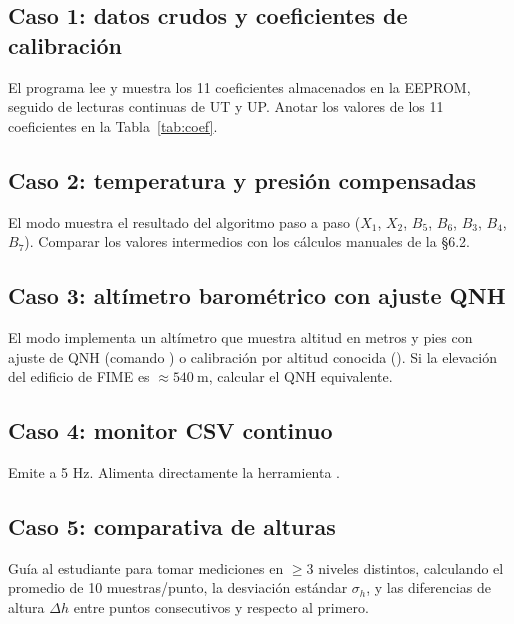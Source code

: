 \documentclass[11pt]{article}
\begin{document}
\subsection{Caso 1: datos crudos y coeficientes de calibración}
El programa lee y muestra los 11 coeficientes almacenados en la EEPROM, seguido de
lecturas continuas de UT y UP. Anotar los valores de los 11 coeficientes en la
Tabla~\ref{tab:coef}.

\subsection{Caso 2: temperatura y presión compensadas}
El modo muestra el resultado del algoritmo paso a paso ($X_1$, $X_2$, $B_5$, $B_6$,
$B_3$, $B_4$, $B_7$). Comparar los valores intermedios con los cálculos manuales de la
\S6.2.

\subsection{Caso 3: altímetro barométrico con ajuste QNH}
El modo implementa un altímetro que muestra altitud en metros y pies con ajuste de QNH
(comando ) o calibración por altitud conocida (). Si la elevación del
edificio de FIME es $\approx\SI{540}{\meter}$, calcular el QNH equivalente.

\subsection{Caso 4: monitor CSV continuo}
Emite  a 5 Hz. Alimenta directamente
la herramienta .

\subsection{Caso 5: comparativa de alturas}
Guía al estudiante para tomar mediciones en $\ge 3$ niveles distintos, calculando el
promedio de 10 muestras/punto, la desviación estándar $\sigma_h$, y las diferencias de
altura $\Delta h$ entre puntos consecutivos y respecto al primero.
\end{document}
